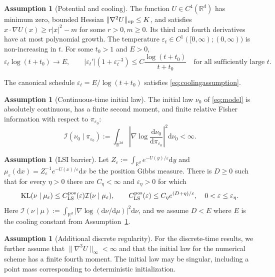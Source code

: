 \documentclass[11pt]{article}
\theoremstyle{definition}
\newtheorem{assumption}[theorem]{Assumption}
\newcommand{\R}{\mathbb R}
\newcommand{\dd}{\mathrm d}
\newcommand{\KL}{\operatorname{KL}}
\newcommand{\cI}{\mathcal I}
\newcommand{\eps}{\varepsilon}
\begin{document}
\begin{assumption}[Potential and cooling]\label{ass:potential}
The function $U\in C^4(\R^d)$ has minimum zero, bounded Hessian
$\|\nabla^2U\|_{\rm op}\leq K$, and satisfies
$x\cdot\nabla U(x)\geq r|x|^2-m$ for some $r>0,m\geq0$.
Its third and fourth derivatives have at most polynomial growth.
The temperature $\eps_t\in C^1([0,\infty);(0,\infty))$ is non-increasing in $t$. For
some $t_0>1$ and $E>0$,
\begin{equation}\label{eq:coolingassumption}
 \eps_t\log(t+t_0)\longrightarrow E,
 \qquad
 |\eps_t'|(1+\eps_t^{-3})
 \leq C\frac{\log(t+t_0)}{t+t_0}
 \quad\text{for all sufficiently large }t.
\end{equation}
\end{assumption}

The canonical schedule $\eps_t=E/\log(t+t_0)$ satisfies
\eqref{eq:coolingassumption}.

\begin{assumption}[Continuous-time initial law]\label{ass:initial}
The initial law $\nu_0$ of \eqref{eq:model} is absolutely continuous, has a finite
second moment, and finite
relative Fisher information with respect to $\pi_{\eps_0}$:
\begin{equation}\label{eq:initialfisher}
 \cI(\nu_0\mid\pi_{\eps_0})
 :=\int_{\R^{3d}}
 \left|\nabla\log\frac{\dd\nu_0}{\dd\pi_{\eps_0}}\right|^2\dd\nu_0
 <\infty.
\end{equation}
\end{assumption}

\begin{assumption}[LSI barrier]\label{ass:lsi}
Let $Z_\eps:=\int_{\R^d}e^{-U(y)/\eps}\dd y$ and
$\mu_\eps(\dd x)=Z_\eps^{-1}e^{-U(x)/\eps}\dd x$ be the position
Gibbs measure. There is $D\geq0$ such that for every $\eta>0$ there are
$C_\eta<\infty$ and $\eps_\eta>0$ for which
\begin{equation}\label{eq:lsi}
 \KL(\nu\mid\mu_\eps)\leq C_{\rm LS}^{\rm pos}(\eps)
       \cI(\nu\mid\mu_\eps),
 \qquad C_{\rm LS}^{\rm pos}(\eps)\leq C_\eta e^{(D+\eta)/\eps},
 \quad 0<\eps\leq\eps_\eta.
\end{equation}
Here $\cI(\nu\mid\mu):=\int_{\R^d}|\nabla\log(\dd\nu/\dd\mu)|^2\dd\nu$, and we assume
$D<E$ where $E$ is the cooling
constant from Assumption~\ref{ass:potential}.
\end{assumption}

\begin{assumption}[Additional discrete regularity]\label{ass:discrete}
For the discrete-time results, we further assume that
$\|\nabla^3U\|_\infty<\infty$ and that the initial law for the numerical
scheme has a finite fourth moment. The initial law may be singular, including
a point mass corresponding to deterministic initialization.
\end{assumption}
\end{document}
